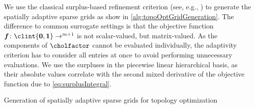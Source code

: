 We use the classical surplus-based refinement criterion
(see, e.g., \cite{Pflueger10Spatially})
to generate the spatially adaptive sparse grids
as show in \cref{alg:topoOptGridGeneration}.
The difference to common surrogate settings is that the objective function
$\*f\colon \clint{\*0, \*1} \to \real^{m+1}$
is not scalar-valued, but matrix-valued.
As the components of $\cholfactor$ cannot be evaluated individually,
the adaptivity criterion has to consider all entries at once
to avoid performing unnecessary evaluations.
We use the surpluses in the piecewise linear hierarchical basis,
as their absolute values correlate with the second mixed derivative
of the objective function due to \eqref{eq:surplusIntegral}.

\begin{algorithm}
  \begin{algorithmic}[1]
      \While{\True}
        \State{$\ngp \gets \setsize{\sgset}$}
        \IfOneLine{$\liset^\ast = \emptyset$}{\Break{}}
      \EndWhile{}
    \EndFunction{}
  \end{algorithmic}
  \caption[%
    Generation of spatially adaptive sparse grids for topology optimization%

\end{algorithm}
